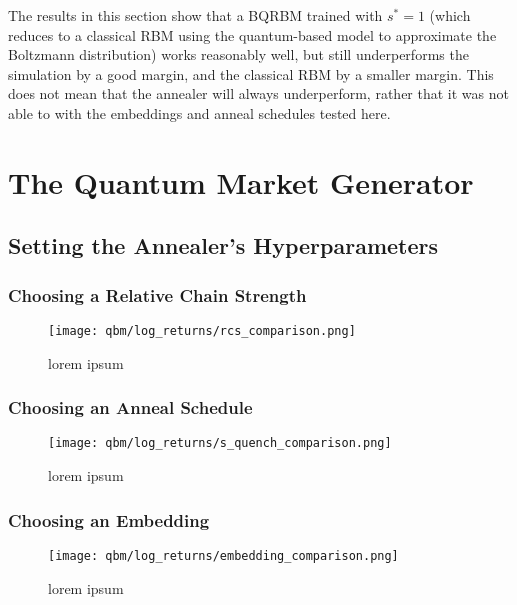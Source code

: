The results in this section show that a BQRBM trained with \( s^* = 1 \) (which reduces to a classical RBM using the quantum-based model to approximate the Boltzmann distribution) works reasonably well, but still underperforms the simulation by a good margin, and the classical RBM by a smaller margin.
This does not mean that the annealer will always underperform, rather that it was not able to with the embeddings and anneal schedules tested here.

\section{The Quantum Market Generator}
\subsection{Setting the Annealer's Hyperparameters}
\subsubsection{Choosing a Relative Chain Strength}
\begin{figure}[!htb]
    \begin{center}
        \texttt{[image: qbm/log\_returns/rcs\_comparison.png]}
    \end{center}
    \caption{lorem ipsum}
    \label{fig:qbm_log_returns_rcs_comparison}
\end{figure}

\subsubsection{Choosing an Anneal Schedule}
\begin{figure}[!htb]
    \begin{center}
        \texttt{[image: qbm/log\_returns/s\_quench\_comparison.png]}
    \end{center}
    \caption{lorem ipsum}
    \label{fig:qbm_log_returns_s_quench_comparison}
\end{figure}

\subsubsection{Choosing an Embedding}
\begin{figure}[!htb]
    \begin{center}
        \texttt{[image: qbm/log\_returns/embedding\_comparison.png]}
    \end{center}
    \caption{lorem ipsum}
    \label{fig:qbm_log_returns_embedding_comparison}
\end{figure}

